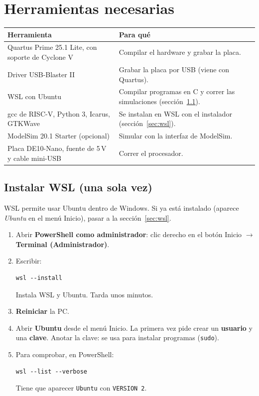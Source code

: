 \documentclass[11pt,a4paper]{article}
\newcommand{\code}[1]{\texttt{#1}}
\newcommand{\menu}[1]{\textsf{\textbf{#1}}}
\begin{document}
\section{Herramientas necesarias}

\begin{center}
\begin{tabularx}{\linewidth}{lL}
\toprule
Herramienta & Para qué \\
\midrule
Quartus Prime 25.1 Lite, con soporte de Cyclone V & Compilar el hardware y grabar la placa. \\
Driver USB-Blaster II & Grabar la placa por USB (viene con Quartus). \\
WSL con Ubuntu & Compilar programas en C y correr las simulaciones (sección~\ref{sec:wslinst}). \\
gcc de RISC-V, Python 3, Icarus, GTKWave & Se instalan en WSL con el instalador (sección~\ref{sec:wsl}). \\
ModelSim 20.1 Starter (opcional) & Simular con la interfaz de ModelSim. \\
Placa DE10-Nano, fuente de 5\,V y cable mini-USB & Correr el procesador. \\
\bottomrule
\end{tabularx}
\end{center}

\subsection{Instalar WSL (una sola vez)}\label{sec:wslinst}

WSL permite usar Ubuntu dentro de Windows. Si ya está instalado (aparece \emph{Ubuntu} en el menú Inicio), pasar a la sección~\ref{sec:wsl}.

\begin{enumerate}
\item Abrir \textbf{PowerShell como administrador}: clic derecho en el botón Inicio $\to$ \menu{Terminal (Administrador)}.
\item Escribir:
\begin{lstlisting}
wsl --install
\end{lstlisting}
Instala WSL y Ubuntu. Tarda unos minutos.
\item \textbf{Reiniciar} la PC.
\item Abrir \textbf{Ubuntu} desde el menú Inicio. La primera vez pide crear un \textbf{usuario} y una \textbf{clave}. Anotar la clave: se usa para instalar programas (\code{sudo}).
\item Para comprobar, en PowerShell:
\begin{lstlisting}
wsl --list --verbose
\end{lstlisting}
Tiene que aparecer \code{Ubuntu} con \code{VERSION 2}.
\end{enumerate}
\end{document}
